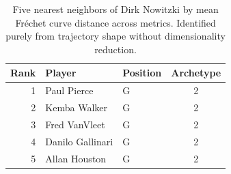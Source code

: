 \begin{table}[htbp]
  \centering\small
  \begin{tabular}{rllc}
    \toprule
    Rank & Player & Position & Archetype \\
    \midrule
    1 & Paul Pierce & G & 2 \\
    2 & Kemba Walker & G & 2 \\
    3 & Fred VanVleet & G & 2 \\
    4 & Danilo Gallinari & G & 2 \\
    5 & Allan Houston & G & 2 \\
    \bottomrule
  \end{tabular}
  \caption{Five nearest neighbors of Dirk Nowitzki by mean Fr\'{e}chet curve distance across metrics. Identified purely from trajectory shape without dimensionality reduction.}
  \label{tab:Dirk_Nowitzki_frechet_curve_neighbors}
\end{table}

